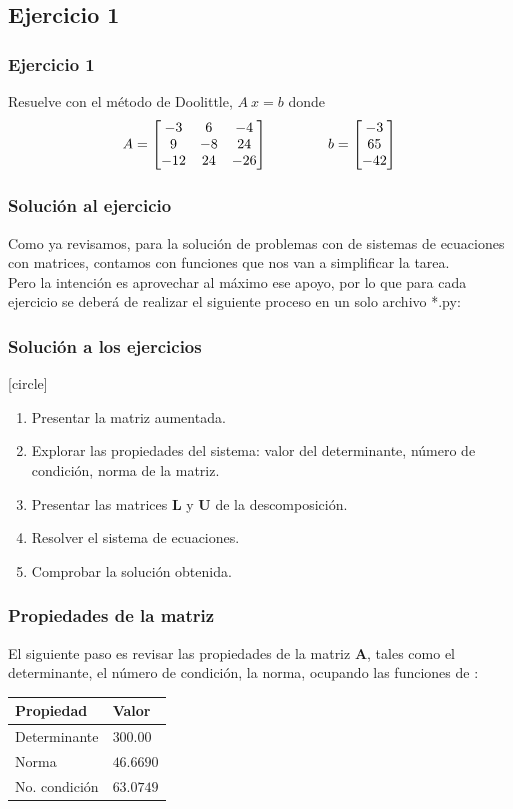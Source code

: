 \subsection{Ejercicio 1}
\begin{frame}
\frametitle{Ejercicio 1}
Resuelve con el método de Doolittle, $A \: x = b$ donde
\begin{align*}
A =
\begin{bmatrix}
-3 & 6 & -4 \\
9 & -8 & 24 \\
-12 & 24 & -26 
\end{bmatrix}
\hspace{1.5cm} b =
\begin{bmatrix}
-3 \\
65 \\
-42
\end{bmatrix}
\end{align*}
\end{frame}
\begin{frame}
\frametitle{Solución al ejercicio}
Como ya revisamos, para la solución de problemas con \python{} de sistemas de ecuaciones con matrices, contamos con funciones que nos van a simplificar la tarea.
\\
\bigskip
Pero la intención es aprovechar al máximo ese apoyo, por lo que para cada ejercicio se deberá de realizar el siguiente proceso en un solo archivo *.py:
\end{frame}
\begin{frame}
\frametitle{Solución a los ejercicios}
[circle]
\begin{enumerate}[<+->]
\item Presentar la matriz aumentada.
\item Explorar las propiedades del sistema: valor del determinante, número de condición, norma de la matriz.
\item Presentar las matrices $\mathbf{L}$ y $\mathbf{U}$ de la descomposición.
\item Resolver el sistema de ecuaciones.
\item Comprobar la solución obtenida.
\end{enumerate}
\end{frame}
\begin{frame}
\frametitle{Propiedades de la matriz}
El siguiente paso es revisar las propiedades de la matriz $\mathbf{A}$, tales como el determinante, el número de condición, la norma, ocupando las funciones de :
\begin{table}
\begin{tabular}{l l}
Propiedad & Valor \\ \hline
Determinante & $300.00$\\ \hline
Norma & $46.6690$ \\ \hline
No. condición & $63.0749$ \\ \hline
\end{tabular}
\end{table}
\end{frame}
